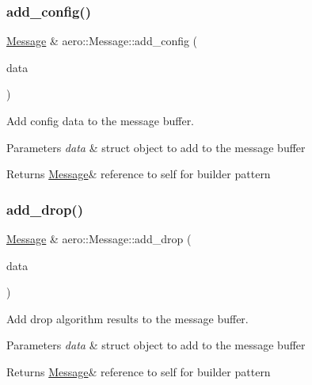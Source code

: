 \subsubsection{\texorpdfstring{add\+\_\+config()}{add\_config()}}
{\footnotesize\ttfamily \hyperlink{classaero_1_1Message}{Message} \& aero\+::\+Message\+::add\+\_\+config (\begin{DoxyParamCaption}\item[{const Config \&}]{data }\end{DoxyParamCaption})}



Add config data to the message buffer. 


\begin{DoxyParams}{Parameters}
{\em data} & struct object to add to the message buffer \\
\hline
\end{DoxyParams}
\begin{DoxyReturn}{Returns}
\hyperlink{classaero_1_1Message}{Message}\& reference to self for builder pattern 
\end{DoxyReturn}
\mbox{\label{classaero_1_1Message_a7363b2fdca085d956e1cced06d251fba}} 
\subsubsection{\texorpdfstring{add\+\_\+drop()}{add\_drop()}}
{\footnotesize\ttfamily \hyperlink{classaero_1_1Message}{Message} \& aero\+::\+Message\+::add\+\_\+drop (\begin{DoxyParamCaption}\item[{const Drop\+Algo \&}]{data }\end{DoxyParamCaption})}



Add drop algorithm results to the message buffer. 


\begin{DoxyParams}{Parameters}
{\em data} & struct object to add to the message buffer \\
\hline
\end{DoxyParams}
\begin{DoxyReturn}{Returns}
\hyperlink{classaero_1_1Message}{Message}\& reference to self for builder pattern 
\end{DoxyReturn}
\mbox{\label{classaero_1_1Message_a23084d7acb0f27c23c8fc6a7e156a0b9}} 
